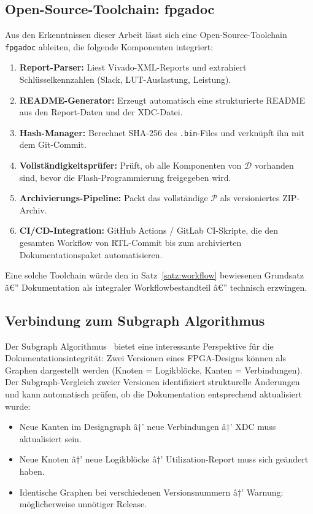 ﻿\documentclass[a4paper,12pt]{article}
\theoremstyle{definition}
\begin{document}
\subsection{Open-Source-Toolchain: fpgadoc}

Aus den Erkenntnissen dieser Arbeit lässt sich eine Open-Source-Toolchain
\texttt{fpgadoc} ableiten, die folgende Komponenten integriert:

\begin{enumerate}
    \item \textbf{Report-Parser:} Liest Vivado-XML-Reports und extrahiert
          Schlüsselkennzahlen (Slack, LUT-Auslastung, Leistung).
    \item \textbf{README-Generator:} Erzeugt automatisch eine strukturierte
          README aus den Report-Daten und der XDC-Datei.
    \item \textbf{Hash-Manager:} Berechnet SHA-256 des \texttt{.bin}-Files
          und verknüpft ihn mit dem Git-Commit.
    \item \textbf{Vollständigkeitsprüfer:} Prüft, ob alle Komponenten
          von $\mathcal{D}$ vorhanden sind, bevor die Flash-Programmierung
          freigegeben wird.
    \item \textbf{Archivierungs-Pipeline:} Packt das vollständige
          $\mathcal{P}$ als versioniertes ZIP-Archiv.
    \item \textbf{CI/CD-Integration:} GitHub Actions / GitLab CI-Skripte,
          die den gesamten Workflow von RTL-Commit bis zum archivierten
          Dokumentationspaket automatisieren.
\end{enumerate}

Eine solche Toolchain würde den in Satz~\ref{satz:workflow} bewiesenen
Grundsatz â€” Dokumentation als integraler Workflowbestandteil â€” technisch
erzwingen.

\subsection{Verbindung zum Subgraph Algorithmus}

Der Subgraph Algorithmus~\cite{epp2026} bietet eine interessante Perspektive
für die Dokumentationsintegrität: Zwei Versionen eines FPGA-Designs können
als Graphen dargestellt werden (Knoten = Logikblöcke, Kanten = Verbindungen).
Der Subgraph-Vergleich zweier Versionen identifiziert strukturelle Änderungen
und kann automatisch prüfen, ob die Dokumentation entsprechend aktualisiert wurde:
\begin{itemize}
    \item Neue Kanten im Designgraph â†’ neue Verbindungen â†’ XDC muss
          aktualisiert sein.
    \item Neue Knoten â†’ neue Logikblöcke â†’ Utilization-Report muss
          sich geändert haben.
    \item Identische Graphen bei verschiedenen Versionsnummern â†’ Warnung:
          möglicherweise unnötiger Release.
\end{itemize}
\end{document}
